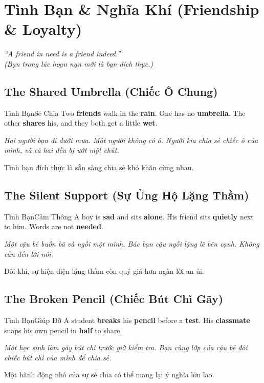 \chapter{Tình Bạn \& Nghĩa Khí (Friendship \& Loyalty)}

\begin{center}
  \textit{\color{truyenblue}``A friend in need is a friend indeed.''}\\
  \textit{(Bạn trong lúc hoạn nạn mới là bạn đích thực.)}
\end{center}

\ngancach

\section{The Shared Umbrella (Chiếc Ô Chung)}
\begin{truyen}{Tình Bạn}{Sẻ Chia}
Two \textbf{friends} walk in the \textbf{rain}. One has no \textbf{umbrella}. The other \textbf{shares} his, and they both get a little \textbf{wet}.

\textit{Hai người bạn đi dưới mưa. Một người không có ô. Người kia chia sẻ chiếc ô của mình, và cả hai đều bị ướt một chút.}

\begin{baihoc}
Tình bạn đích thực là sẵn sàng chia sẻ khó khăn cùng nhau.
\end{baihoc}
\end{truyen}

\section{The Silent Support (Sự Ủng Hộ Lặng Thầm)}
\begin{truyen}{Tình Bạn}{Cảm Thông}
A boy is \textbf{sad} and sits \textbf{alone}. His friend sits \textbf{quietly} next to him. Words are not \textbf{needed}.

\textit{Một cậu bé buồn bã và ngồi một mình. Bác bạn cậu ngồi lặng lẽ bên cạnh. Không cần đến lời nói.}

\begin{baihoc}
Đôi khi, sự hiện diện lặng thầm còn quý giá hơn ngàn lời an ủi.
\end{baihoc}
\end{truyen}

\section{The Broken Pencil (Chiếc Bút Chì Gãy)}
\begin{truyen}{Tình Bạn}{Giúp Đỡ}
A student \textbf{breaks} his \textbf{pencil} before a \textbf{test}. His \textbf{classmate} snaps his own pencil in \textbf{half} to share.

\textit{Một học sinh làm gãy bút chì trước giờ kiểm tra. Bạn cùng lớp của cậu bẻ đôi chiếc bút chì của mình để chia sẻ.}

\begin{baihoc}
Một hành động nhỏ của sự sẻ chia có thể mang lại ý nghĩa lớn lao.
\end{baihoc}
\end{truyen}

